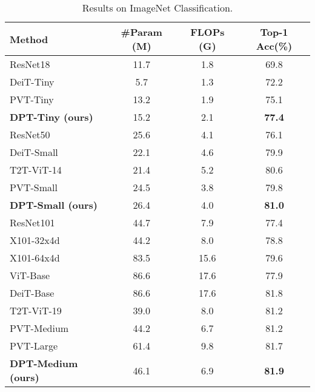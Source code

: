 \documentclass[sigconf,screen]{acmart}
\begin{document}
\begin{table}
  \caption{Results on ImageNet Classification.}
  \label{tab:cls_result}
  \begin{tabular}{lccc}
    \toprule
    Method & \#Param (M) & FLOPs (G) & Top-1 Acc(\%)\\
    \midrule
    ResNet18 \cite{resnet}  & 11.7 & 1.8 & 69.8\\
    DeiT-Tiny \cite{deit}   & 5.7  & 1.3 & 72.2\\
    PVT-Tiny \cite{pvt}     & 13.2 & 1.9 & 75.1\\
    \textbf{DPT-Tiny (ours)}& 15.2 & 2.1 & \textbf{77.4}\\
    \midrule
    ResNet50 \cite{resnet}   & 25.6 & 4.1 & 76.1\\
    DeiT-Small \cite{deit}   & 22.1 & 4.6 & 79.9\\
    T2T-ViT-14 \cite{t2tvit} & 21.4 & 5.2 & 80.6\\
    PVT-Small \cite{pvt}     & 24.5 & 3.8 & 79.8\\
    \textbf{DPT-Small (ours)}& 26.4 & 4.0 & \textbf{81.0}\\
    \midrule
    ResNet101 \cite{resnet}   & 44.7 & 7.9 & 77.4\\
    X101-32x4d \cite{resnext} & 44.2 & 8.0 & 78.8\\
    X101-64x4d \cite{resnext} & 83.5 & 15.6& 79.6\\
    ViT-Base \cite{vit}       & 86.6 & 17.6& 77.9\\
    DeiT-Base \cite{deit}     & 86.6 & 17.6& 81.8\\
    T2T-ViT-19 \cite{t2tvit}  & 39.0 & 8.0 & 81.2\\
    PVT-Medium \cite{pvt}     & 44.2 & 6.7 & 81.2\\
    PVT-Large \cite{pvt}      & 61.4 & 9.8 & 81.7\\
    \textbf{DPT-Medium (ours)}& 46.1 & 6.9 & \textbf{81.9}\\
  \bottomrule
\end{tabular}
\end{table}
\end{document}
